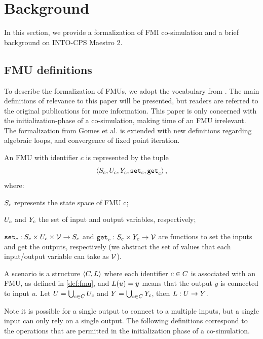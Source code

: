 \section{Background}\label{sc:background}
In this section, we provide a formalization of FMI co-simulation and a brief background on INTO-CPS Maestro 2.

\subsection{FMU definitions}
To describe the formalization of FMUs, we adopt the vocabulary from \cite{gomes_lucio_vangheluwe_2019}. The main definitions of relevance to this paper will be presented, but readers are referred to the original publications for more information. This paper is only concerned with the initialization-phase of a co-simulation, making time of an FMU irrelevant. The formalization from Gomes et al. is extended with new definitions regarding algebraic loops, and convergence of fixed point iteration.
\begin{definition}[FMU]\label{def:fmu}
  An FMU with identifier $c$ is represented by the tuple   
  $$ \left\langle S_{c}, U_{c}, Y_{c}, \mathtt{set}_{c}, \mathtt{get}_{c} \right\rangle ,$$
  where:
  \begin{inparadesc}
    \item $S_{c}$ represents the state space of FMU c;
    \item $U_{c}$ and $Y_{c}$ the set of input and output variables, respectively;
    \item $\mathtt{set}_{c} : S_{c} \times U_{c} \times \mathcal{V} \to S_{c}$ and $\mathtt{get}_{c}: S_{c} \times Y_{c} \to \mathcal{V}$ are functions to set the inputs and get the outputs, respectively (we abstract the set of values that each input/output variable can take as $\mathcal{V}$).
  \end{inparadesc}
\end{definition}

\begin{definition}[Scenario]\label{def:cosim_scenario}
  A scenario is a structure $ \left\langle C, L \right\rangle $ where each identifier $c \in C$ is associated with an FMU, as defined in \cref{def:fmu}, and $L(u)=y$ means that the output $y$ is connected to input $u$.
  Let $U = \bigcup_{c \in C} U_{c}$ and $Y = \bigcup_{c \in C} Y_{c}$, then $L : U \to Y$.
\end{definition}
Note it is possible for a single output to connect to a multiple inputs, but a single input can only rely on a single output.
The following definitions correspond to the operations that are permitted in the initialization phase of a co-simulation.

